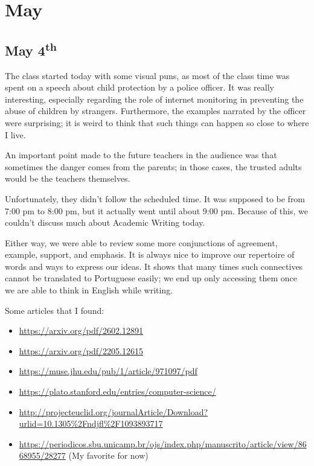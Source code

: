 \chapter{May}

\section[May 4th]{May 4\textsuperscript{th}}
The class started today with some visual puns, as most of the class time was spent on a speech about child protection by a police officer. It was really interesting, especially regarding the role of internet monitoring in preventing the abuse of children by strangers. Furthermore, the examples narrated by the officer were surprising; it is weird to think that such things can happen so close to where I live.

An important point made to the future teachers in the audience was that sometimes the danger comes from the parents; in those cases, the trusted adults would be the teachers themselves.

Unfortunately, they didn't follow the scheduled time. It was supposed to be from 7:00 pm to 8:00 pm, but it actually went until about 9:00 pm. Because of this, we couldn't discuss much about Academic Writing today.

Either way, we were able to review some more conjunctions of agreement, example, support, and emphasis. It is always nice to improve our repertoire of words and ways to express our ideas. It shows that many times such connectives cannot be translated to Portuguese easily; we end up only accessing them once we are able to think in English while writing.

Some articles that I found:
\begin{itemize}
    \item \url{https://arxiv.org/pdf/2602.12891}
    \item \url{https://arxiv.org/pdf/2205.12615}
    \item \url{https://muse.jhu.edu/pub/1/article/971097/pdf}
    \item \url{https://plato.stanford.edu/entries/computer-science/}
    \item \url{http://projecteuclid.org/journalArticle/Download?urlid=10.1305%2Fndjfl%2F1093893717}
    \item \url{https://periodicos.sbu.unicamp.br/ojs/index.php/manuscrito/article/view/8668955/28277} (My favorite for now)
\end{itemize}

